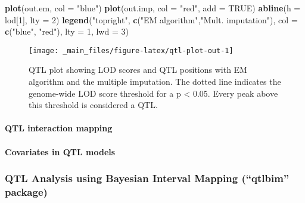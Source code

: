 \documentclass[12pt,]{krantz}
\newenvironment{Shaded}{\begin{snugshade}}{\end{snugshade}}
\newcommand{\KeywordTok}[1]{\textcolor[rgb]{0.27,0.27,0.27}{\textbf{{#1}}}}
\newcommand{\DataTypeTok}[1]{\textcolor[rgb]{0.27,0.27,0.27}{{#1}}}
\newcommand{\DecValTok}[1]{\textcolor[rgb]{0.06,0.06,0.06}{{#1}}}
\newcommand{\StringTok}[1]{\textcolor[rgb]{0.5,0.5,0.5}{{#1}}}
\newcommand{\OtherTok}[1]{\textcolor[rgb]{0.37,0.37,0.37}{{#1}}}
\newcommand{\NormalTok}[1]{{#1}}
\let\oldparagraph\paragraph
\renewcommand{\paragraph}[1]{\oldparagraph{#1}\mbox{}}
\theoremstyle{definition}
\theoremstyle{definition}
\theoremstyle{remark}
\begin{document}
\begin{Shaded}
\begin{Highlighting}[]
\KeywordTok{plot}\NormalTok{(out.em, }\DataTypeTok{col =} \StringTok{"blue"}\NormalTok{)}
\KeywordTok{plot}\NormalTok{(out.imp, }\DataTypeTok{col =} \StringTok{"red"}\NormalTok{, }\DataTypeTok{add =} \OtherTok{TRUE}\NormalTok{)}
\KeywordTok{abline}\NormalTok{(}\DataTypeTok{h =} \NormalTok{lod[}\DecValTok{1}\NormalTok{], }\DataTypeTok{lty =} \DecValTok{2}\NormalTok{)}
\KeywordTok{legend}\NormalTok{(}\StringTok{"topright"}\NormalTok{, }\KeywordTok{c}\NormalTok{(}\StringTok{"EM algorithm"}\NormalTok{,}\StringTok{"Mult. imputation"}\NormalTok{), }
       \DataTypeTok{col =} \KeywordTok{c}\NormalTok{(}\StringTok{"blue"}\NormalTok{, }\StringTok{"red"}\NormalTok{), }\DataTypeTok{lty =} \DecValTok{1}\NormalTok{, }\DataTypeTok{lwd =} \DecValTok{3}\NormalTok{)}
\end{Highlighting}
\end{Shaded}

\begin{figure}

{\centering \texttt{[image: \_main\_files/figure-latex/qtl-plot-out-1]} 

}

\caption{QTL plot showing LOD scores and QTL positions with EM algorithm and the multiple imputation. The dotted line indicates the genome-wide LOD score threshold for a p < 0.05. Every peak above this threshold is considered a QTL.}\label{fig:qtl-plot-out}
\end{figure}

\paragraph{QTL interaction mapping}\label{qtl-interaction-mapping}

\paragraph{Covariates in QTL models}\label{covariates-in-qtl-models}

\subsubsection{\texorpdfstring{QTL Analysis using Bayesian Interval
Mapping (``qtlbim''
package)}{QTL Analysis using Bayesian Interval Mapping (qtlbim package)}}\label{qtl-analysis-using-bayesian-interval-mapping-qtlbim-package}
\end{document}

